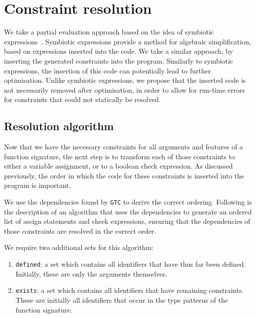 \newcommand{\defined}{\texttt{defined}}
\renewcommand{\exists}{\texttt{exists}}

\section{Constraint resolution}

We take a partial evaluation approach based on the idea of symbiotic expressions~\cite{sac-symbiotic}.
Symbiotic expressions provide a method for algebraic simplification, based on expressions inserted into the code.
We take a similar approach, by inserting the generated constraints into the program.
Similarly to symbiotic expressions, the insertion of this code can potentially lead to further optimisation.
Unlike symbiotic expressions, we propose that the inserted code is not necessarily removed after optimisation, in order to allow for run-time errors for constraints that could not statically be resolved.

\subsection{Resolution algorithm}\label{sec:resoltion}

Now that we have the necessary constraints for all arguments and features of a function signature, the next step is to transform each of those constraints to either a variable assignment, or to a boolean check expression.
As discussed previously, the order in which the code for these constraints is inserted into the program is important.

\noindent
We use the dependencies found by \texttt{GTC} to derive the correct ordering.
Following is the description of an algorithm that uses the dependencies to generate an ordered list of assign statements and check expressions, ensuring that the dependencies of those constraints are resolved in the correct order.

We require two additional sets for this algorithm:
\begin{enumerate}
    \item \defined{}: a set which contains all identifiers that have thus far been defined.
    Initially, these are only the arguments themselves.
    \item \exists{}: a set which contains all identifiers that have remaining constraints.
    These are initially all identifiers that occur in the type patterns of the function signature.
\end{enumerate}

